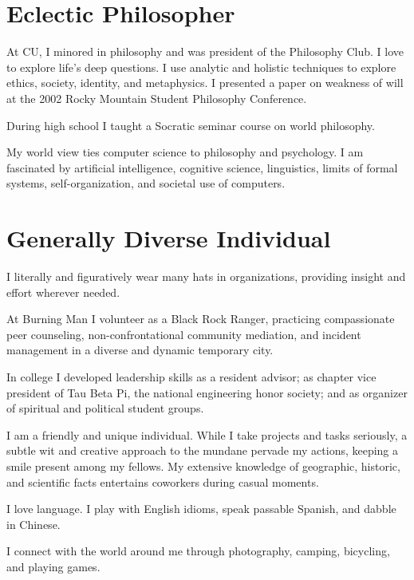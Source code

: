 \section*{Eclectic Philosopher}
  \begin{compactitem}
  \item At CU, I minored in philosophy and was president of the Philosophy Club.
    I love to explore life's deep questions.  I use analytic and holistic
    techniques to explore ethics, society, identity, and metaphysics.
    I presented a paper on weakness of will at the 2002 Rocky Mountain Student
    Philosophy Conference.
  \item During high school I taught a Socratic seminar course on world
    philosophy.
  \item My world view ties computer science to philosophy and psychology.  I am
    fascinated by artificial intelligence, cognitive science, linguistics,
    limits of formal systems, self-organization, and societal use of computers.
  \end{compactitem}
\section*{Generally Diverse Individual}
  \begin{compactitem}
  \item I literally and figuratively wear many hats in organizations,
    providing insight and effort wherever needed.
  \item At Burning Man I volunteer as a Black Rock Ranger, practicing
    compassionate peer counseling, non-confrontational community mediation, and
    incident management in a diverse and dynamic temporary city.
  \item In college I developed leadership skills as a resident advisor; as
    chapter vice president of Tau Beta Pi, the national engineering honor
    society; and as organizer of spiritual and political student groups.
  \item I am a friendly and unique individual.  While I take projects and tasks
    seriously, a subtle wit and creative approach to the mundane pervade my
    actions, keeping a smile present among my fellows. My extensive knowledge of
    geographic, historic, and scientific facts entertains coworkers during
    casual moments.
  \item I love language.  I play with English idioms, speak passable Spanish,
    and dabble in Chinese.
  \item I connect with the world around me through photography, camping,
    bicycling, and playing games.
  \end{compactitem}
